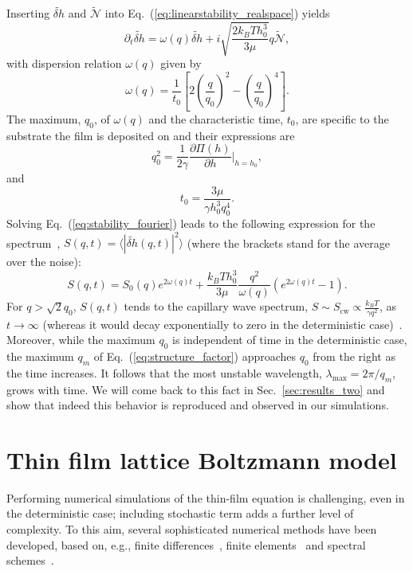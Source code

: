 Inserting $\tilde{\delta h}$ and $\tilde{\mathcal{N}}$ into Eq.~(\ref{eq:linearstability_realspace}) yields
\begin{equation}\label{eq:stability_fourier}
    \partial_t \tilde{\delta h} = \omega(q)\tilde{\delta h} +i\sqrt{\frac{2k_BTh_0^3}{3\mu}}q\tilde{\mathcal{N}},
\end{equation}
with dispersion relation $\omega(q)$ given by
\begin{equation}\label{eq:dispersion}
    \omega(q) = \frac{1}{t_0}\left[2\left(\frac{q}{q_0}\right)^2 - \left(\frac{q}{q_0}\right)^4\right].
\end{equation}
The maximum, $q_0$, of $\omega(q)$ and the characteristic time, $t_0$, are specific to the substrate the film is deposited on and their expressions are~\cite{fetzerThermalNoiseInfluences2007}
\begin{equation}\label{eq:q0}
    q_0^2 = \frac{1}{2\gamma}\frac{\partial \Pi(h)}{\partial h}\bigg\rvert_{h=h_0},
\end{equation}
and
\begin{equation}\label{eq:t0}
    t_0 = \frac{3\mu}{\gamma h_0^3 q_0^4}.
\end{equation}
Solving Eq.~(\ref{eq:stability_fourier}) leads to the following expression for the spectrum~\cite{zhangMolecularSimulationThin2019,meckeThermalFluctuationsThin2005},
$S(q,t) = \langle |\tilde{\delta h}(q,t)|^2\rangle$ (where the brackets stand for the average over the noise):
\begin{equation}\label{eq:structure_factor}
    S(q,t) = S_0(q)e^{2\omega(q)t} + \frac{k_BTh_0^3}{3\mu}\frac{q^2}{\omega(q)}(e^{2\omega(q)t} - 1).
\end{equation}
For $q>\sqrt{2}q_0$, $S(q,t)$ tends to the capillary wave spectrum, $S \sim S_{\text{cw}} \propto \frac{k_BT}{\gamma q^2}$, as $t \rightarrow \infty$ (whereas it would decay exponentially to zero in the deterministic case)~\cite{fetzerThermalNoiseInfluences2007,meckeThermalFluctuationsThin2005}.
Moreover, while the maximum $q_0$ is independent of time in the deterministic case, the maximum $q_m$ of Eq.~(\ref{eq:structure_factor}) approaches $q_0$ from the right as the time increases.
It follows that the most unstable wavelength, $\lambda_{\text{max}} = 2\pi/q_m$, grows with time.
We will come back to this fact in Sec.~\ref{sec:results_two} and show that indeed this behavior is reproduced and observed in our simulations.

\section{Thin film lattice Boltzmann model}\label{sec:num_method}
Performing numerical simulations of the thin-film equation is challenging, even in the deterministic case; including stochastic term adds a further level of complexity.
To this aim, several sophisticated numerical methods have been developed, based on, e.g., finite differences~\cite{diezGlobalModelsMoving2000}, finite elements~\cite{grunThinFilmFlowInfluenced2006} and spectral schemes~\cite{duran-olivenciaInstabilityRuptureFluctuations2019}. 

